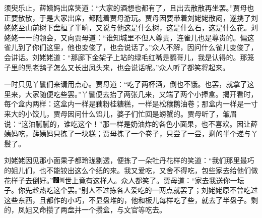 须臾乐止，薛姨妈出席笑道：``大家的酒想也都有了，且出去散散再坐罢。''贾母也正要散散，于是大家出席，都随着贾母游玩。贾母因要带着刘姥姥散闷，遂携了刘姥姥至山前树下盘桓了半晌，又说与他这是什么树，这是什么石，这是什么花。刘姥姥一一的领会，又向贾母道：``谁知城里不但人尊贵，连雀儿也是尊贵的。偏这雀儿到了你们这里，他也变俊了，也会说话了。''众人不解，因问什么雀儿变俊了，会讲话。刘姥姥道：``那廊下金架子上站的绿毛红嘴是鹦哥儿，我是认得的。那笼子里的黑老鸹子怎么又长出凤头来，也会说话呢。''众人听了都笑将起来。

一时只见丫鬟们来请用点心。贾母道：``吃了两杯酒，倒也不饿。也罢，就拿了这里来，大家随便吃些罢。''丫鬟便去抬了两张几来，又端了两个小捧盒。揭开看时，每个盒内两样：这盒内一样是藕粉桂糖糕，一样是松穰鹅油卷；那盒内一样是一寸来大的小饺儿，贾母因问什么馅儿，婆子们忙回是螃蟹的。贾母听了，皱眉说：``这油腻腻的，谁吃这个！''那一样是奶油炸的各色小面果，也不喜欢。因让薛姨妈吃，薛姨妈只拣了一块糕；贾母拣了一个卷子，只尝了一尝，剩的半个递与丫鬟了。

刘姥姥因见那小面果子都玲珑剔透，便拣了一朵牡丹花样的笑道：``我们那里最巧的姐儿们，也不能铰出这么个纸的来。我又爱吃，又舍不得吃，包些家去给他们做花样子去倒好。''{\includegraphics[width=3mm]{../Images/00006}\includegraphics[width=3mm]{../Images/00011}\footnotesize \kaishu 世上竟有这样人。}众人都笑了。贾母道：``家去我送你一坛子。你先趁热吃这个罢。''别人不过拣各人爱吃的一两点就罢了；刘姥姥原不曾吃过这些东西，且都作的小巧，不显盘堆的，他和板儿每样吃了些，就去了半盘子。剩的，凤姐又命攒了两盘并一个攒盒，与文官等吃去。

